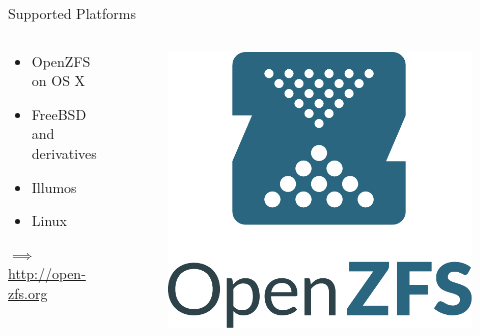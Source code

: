 \begin{frame}{Supported Platforms}
		\begin{columns}
			\begin{column}{0.5\linewidth}
				\begin{itemize}
					\item OpenZFS on OS X
					\item FreeBSD and derivatives
					\item Illumos
					\item Linux
				\end{itemize}
				\vspace{2em}
				$\implies$ \url{http://open-zfs.org}
			\end{column}
			\begin{column}{0.5\linewidth}
				\begin{figure}
					\centering
					\includegraphics[height=0.4\textheight]{assets/openzfs_logo}
				\end{figure}
			\end{column}
		\end{columns}
\end{frame}